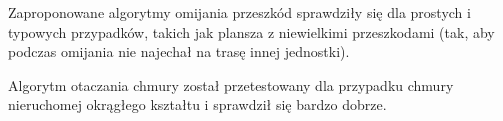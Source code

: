 \documentclass[a4paper, 12pt]{article}
\begin{document}
	Zaproponowane algorytmy omijania przeszkód sprawdziły się dla prostych i typowych przypadków, takich jak plansza z niewielkimi przeszkodami (tak, aby podczas omijania nie najechał na trasę innej jednostki).
	
	Algorytm otaczania chmury został przetestowany dla przypadku chmury nieruchomej okrągłego kształtu i sprawdził się bardzo dobrze.
	
	
	
	
	
\end{document}
